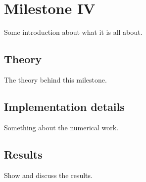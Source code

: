 \section{Milestone IV}
Some introduction about what it is all about.

\subsection{Theory}
The theory behind this milestone.

\subsection{Implementation details}
Something about the numerical work.

\subsection{Results}
Show and discuss the results.
